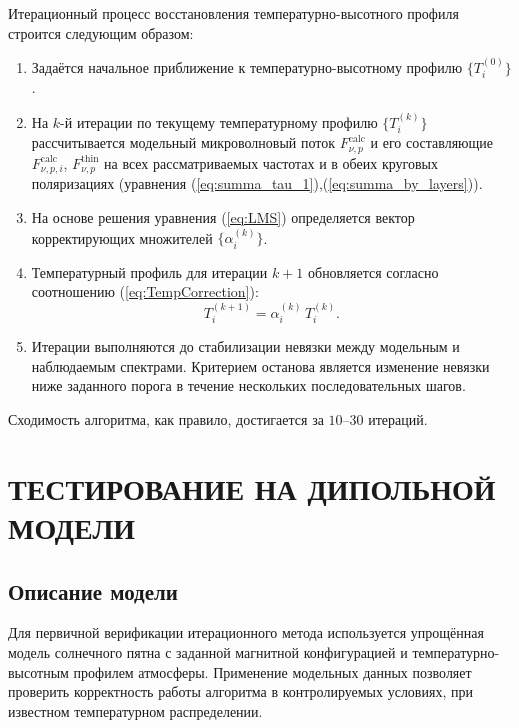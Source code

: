 \documentclass[
 aps, pra,
 amsmath,amssymb,
 11pt,
 final,
tightenlines,
 twoside,
 twocolumn,
 nofloats,
nofootinbib,
 superscriptaddress,
showkeys,
showkeywords,
 ]
{revtex4-2}
\begin{document}
Итерационный процесс восстановления температурно-высотного профиля строится следующим образом:
\begin{enumerate}
  \label{list:iterations}
  \item Задаётся начальное приближение к температурно-высотному профилю $\{T_i^{(0)}\}$.
  
  \item На $k$-й итерации по текущему температурному профилю $\{T_i^{(k)}\}$ рассчитывается модельный микроволновый поток $F_{\nu, p}^{\mathrm{calc}}$ и его составляющие $F_{\nu,p,i}^{\mathrm{calc}}$, $F_{\nu,p}^{\mathrm{thin}}$ на всех рассматриваемых частотах и в обеих круговых поляризациях (уравнения (\ref{eq:summa_tau_1}),(\ref{eq:summa_by_layers})).

  \item На основе решения уравнения (\ref{eq:LMS}) определяется вектор корректирующих множителей $\{\alpha_i^{(k)}\}$.
  
  \item Температурный профиль для итерации $k+1$ обновляется согласно соотношению (\ref{eq:TempCorrection}):
  \begin{equation*}
  T_i^{(k+1)} = \alpha_i^{(k)}\, T_i^{(k)} .
  \end{equation*}
  
  \item  Итерации выполняются до стабилизации невязки между модельным и наблюдаемым спектрами.
Критерием останова является изменение невязки ниже заданного порога в течение нескольких последовательных шагов.

\end{enumerate}

Сходимость алгоритма, как правило, достигается за $10$--$30$ итераций.

\section{ТЕСТИРОВАНИЕ НА ДИПОЛЬНОЙ МОДЕЛИ}
\subsection{Описание модели}

Для первичной верификации итерационного метода используется упрощённая модель солнечного пятна с заданной магнитной конфигурацией и температурно-высотным профилем атмосферы. Применение модельных данных позволяет проверить корректность работы алгоритма в контролируемых условиях, при известном температурном распределении.
\end{document}
